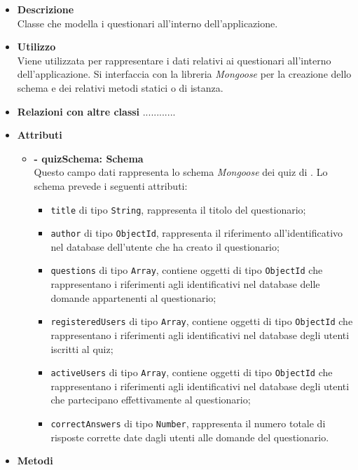 \begin{itemize}
	\item \textbf{Descrizione} \\
	Classe che modella i questionari all'interno dell'applicazione.
	\item \textbf{Utilizzo} \\
	Viene utilizzata per rappresentare i dati relativi ai questionari all'interno dell'applicazione. Si interfaccia con la libreria \textit{Mongoose} per la creazione dello schema e dei relativi metodi statici o di istanza.
	\item \textbf{Relazioni con altre classi}
		............
	\item \textbf{Attributi}
		\begin{itemize}
			\item \textbf{- quizSchema: Schema} \\
			Questo campo dati rappresenta lo schema \textit{Mongoose} dei quiz di \progetto. Lo schema prevede i seguenti attributi:
				\begin{itemize}
					\item \texttt{title} di tipo \texttt{String}, rappresenta il titolo del questionario;
					\item \texttt{author} di tipo \texttt{ObjectId}, rappresenta il riferimento all'identificativo nel database dell'utente che ha creato il questionario;
					\item \texttt{questions} di tipo \texttt{Array}, contiene oggetti di tipo \texttt{ObjectId} che rappresentano i riferimenti agli identificativi nel database delle domande appartenenti al questionario;
					\item \texttt{registeredUsers} di tipo \texttt{Array}, contiene oggetti di tipo \texttt{ObjectId} che rappresentano i riferimenti agli identificativi nel database degli utenti iscritti al quiz;
					\item \texttt{activeUsers} di tipo \texttt{Array}, contiene oggetti di tipo \texttt{ObjectId} che rappresentano i riferimenti agli identificativi nel database degli utenti che partecipano effettivamente al questionario;
					\item \texttt{correctAnswers} di tipo \texttt{Number}, rappresenta il numero totale di risposte corrette date dagli utenti alle domande del questionario.	
				\end{itemize}
		\end{itemize}
	\item \textbf{Metodi}
		\begin{itemize}

\end{itemize}
\end{itemize}
